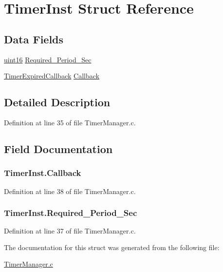 \hypertarget{struct_timer_inst}{
\section{TimerInst Struct Reference}
\label{struct_timer_inst}
}
\subsection*{Data Fields}
\begin{DoxyCompactItemize}
\item 
\hyperlink{hal__types_8h_a05f6b0ae8f6a6e135b0e290c25fe0e4e}{uint16} \hyperlink{struct_timer_inst_a18d3dbce10d71fadb73defb02521997c}{Required\_\-Period\_\-Sec}
\item 
\hyperlink{_timer_manager_8h_a085441a021a08b6e4e8b1c79f527e235}{TimerExpiredCallback} \hyperlink{struct_timer_inst_abe14cf8e6ab1918ddb3d493c83f4834f}{Callback}
\end{DoxyCompactItemize}


\subsection{Detailed Description}


Definition at line 35 of file TimerManager.c.



\subsection{Field Documentation}
\hypertarget{struct_timer_inst_abe14cf8e6ab1918ddb3d493c83f4834f}{
\subsubsection[{Callback}]{ {\bf TimerInst.Callback}}}
\label{struct_timer_inst_abe14cf8e6ab1918ddb3d493c83f4834f}


Definition at line 38 of file TimerManager.c.

\hypertarget{struct_timer_inst_a18d3dbce10d71fadb73defb02521997c}{
\subsubsection[{Required\_\-Period\_\-Sec}]{ {\bf TimerInst.Required\_\-Period\_\-Sec}}}
\label{struct_timer_inst_a18d3dbce10d71fadb73defb02521997c}


Definition at line 37 of file TimerManager.c.



The documentation for this struct was generated from the following file:\begin{DoxyCompactItemize}
\item 
\hyperlink{_timer_manager_8c}{TimerManager.c}\end{DoxyCompactItemize}
